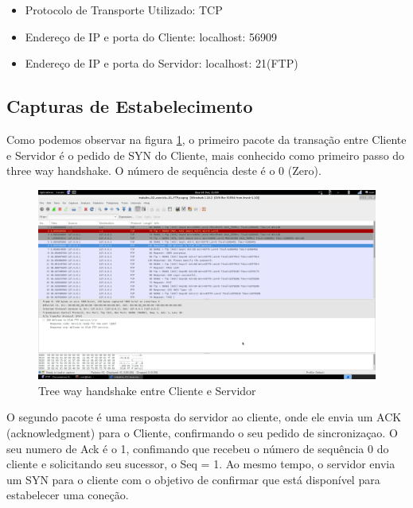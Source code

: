\begin{itemize}

    \item Protocolo de Transporte Utilizado: TCP

    \item Endereço de IP e porta do Cliente: localhost: 56909

    \item Endereço de IP e porta do Servidor: localhost: 21(FTP)

\end{itemize}

\subsection{Capturas de Estabelecimento}

Como podemos observar na figura \ref{fig:ftp1}, o primeiro pacote da transação entre Cliente e Servidor é
o pedido de SYN do Cliente, mais conhecido como primeiro passo do three way handshake. O
número de sequência deste é o 0 (Zero).

\begin{figure}[h]
  \centering

  \includegraphics[width=450px, scale=1]{figuras/ftp1}
  \caption{Tree way handshake entre Cliente e Servidor}

\label{fig:ftp1}
\end{figure}

O segundo pacote é uma resposta do servidor ao cliente, onde ele envia um ACK (acknowledgment)
para o Cliente, confirmando o seu pedido de sincronizaçao. O seu numero de Ack é o 1, confimando
que recebeu o número de sequência 0 do cliente e solicitando seu sucessor, o Seq = 1. Ao mesmo
tempo, o servidor envia um SYN para o cliente com o objetivo de confirmar que está disponível
 para estabelecer uma coneção.

